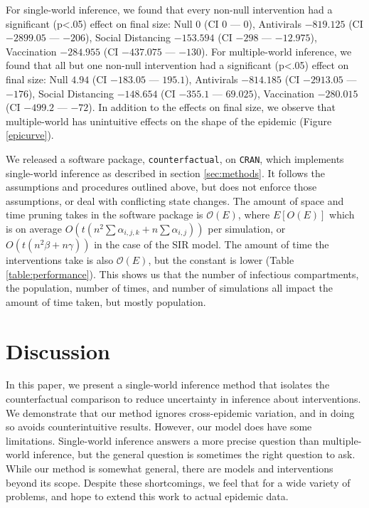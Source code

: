 \documentclass[openacc]{rsproca_new}%
\begin{document}
For single-world inference, we found that every non-null intervention had a significant (p<.05) effect on final size: Null $ 0 $ (CI $ 0 $ --- $ 0 $), Antivirals $ -819.125 $ (CI $ -2899.05 $ --- $ -206 $), Social Distancing $ -153.594 $ (CI $ -298 $ --- $ -12.975 $), Vaccination $ -284.955 $ (CI $ -437.075 $ --- $ -130 $).
For multiple-world inference, we found that all but one non-null intervention had a significant (p<.05) effect on final size: Null $ 4.94 $ (CI $ -183.05 $ --- $ 195.1 $), Antivirals $ -814.185 $ (CI $ -2913.05 $ --- $ -176 $), Social Distancing $ -148.654 $ (CI $ -355.1 $ --- $ 69.025 $), Vaccination $ -280.015 $ (CI $ -499.2 $ --- $ -72 $).
In addition to the effects on final size, we observe that multiple-world has unintuitive effects on the shape of the epidemic (Figure \ref{epicurve}).

We released a software package, \texttt{counterfactual}, on \texttt{CRAN}, %
which implements single-world inference as described in section \ref{sec:methods}.
It follows the assumptions and procedures outlined above, but does not enforce those assumptions, or deal with conflicting state changes.
The amount of space and time pruning takes in the software package is $\mathcal O(E)$, where $E[O(E)]$ which is on average $O(t(n^2\sum \alpha_{i,j,k} + n \sum\alpha_{i,j}))$ per simulation, or $O(t(n^2\beta + n\gamma))$ in the case of the SIR model.
The amount of time the interventions take is also $\mathcal O(E)$, but the constant is lower (Table \ref{table:performance}).
This shows us that the number of infectious compartments, the population, number of times, and number of simulations all impact the amount of time taken, but mostly population.

\section{Discussion}
In this paper, we present a single-world inference method that isolates the counterfactual comparison to reduce uncertainty in inference about interventions.
We demonstrate that our method ignores cross-epidemic variation, and in doing so avoids counterintuitive results.
However, our model does have some limitations.
Single-world inference answers a more precise question than multiple-world inference, but the general question is sometimes the right question to ask.
While our method is somewhat general, there are models and interventions beyond its scope.
Despite these shortcomings, we feel that for a wide variety of problems, and hope to extend this work to actual epidemic data.
\end{document}
